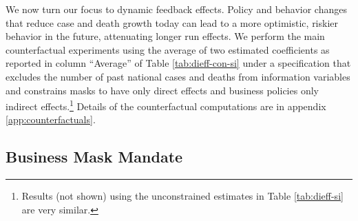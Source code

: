 \documentclass[3p, longtitle]{elsarticle}
\theoremstyle{definition}
\begin{document}
We now turn our focus to dynamic feedback effects. Policy and behavior
changes that reduce case and death growth today can lead to a more
optimistic, riskier behavior in the future, attenuating longer run
effects.  We perform the main counterfactual experiments using the
average of two estimated coefficients as reported in column
``Average'' of Table \ref{tab:dieff-con-si} under a specification that
excludes the number of past national cases and deaths from information
variables and constrains masks to have only direct effects and
business policies only indirect effects.\footnote{Results (not shown)
  using the unconstrained estimates in Table \ref{tab:dieff-si} are
  very similar.} Details of the counterfactual computations are in
appendix \ref{app:counterfactuals}.

\subsection{Business Mask Mandate}
\end{document}
